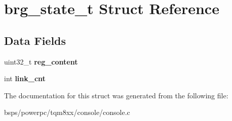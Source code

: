 \hypertarget{structbrg__state__t}{}\section{brg\+\_\+state\+\_\+t Struct Reference}
\label{structbrg__state__t}
\subsection*{Data Fields}
\begin{DoxyCompactItemize}
\item 
\mbox{\label{structbrg__state__t_a893020075907503aff6c84e27d4e8524}} 
uint32\+\_\+t {\bfseries reg\+\_\+content}
\item 
\mbox{\label{structbrg__state__t_a4c26f3958e9fd38499610b2284366e9e}} 
int {\bfseries link\+\_\+cnt}
\end{DoxyCompactItemize}


The documentation for this struct was generated from the following file\+:\begin{DoxyCompactItemize}
\item 
bsps/powerpc/tqm8xx/console/console.\+c\end{DoxyCompactItemize}
